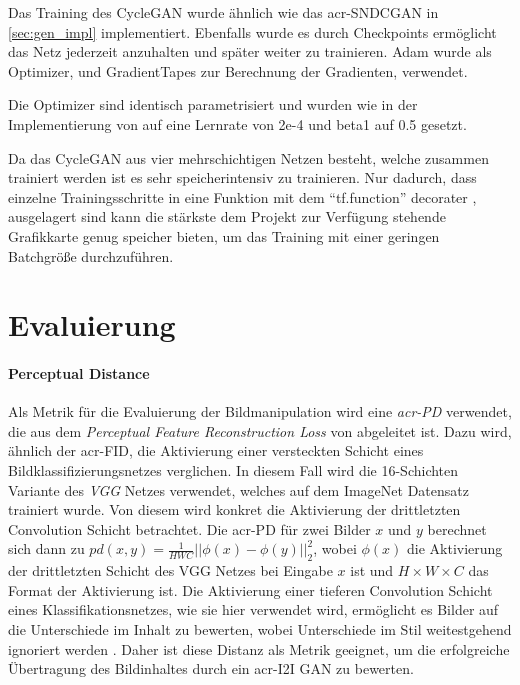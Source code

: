  Das Training des CycleGAN wurde ähnlich wie das \gls{acr-SNDCGAN} in \cref{sec:gen_impl} implementiert. Ebenfalls wurde es durch Checkpoints ermöglicht das Netz jederzeit anzuhalten und später weiter zu trainieren. Adam \cite{tf:adam} wurde als Optimizer, und GradientTapes \cite{tf:gradientape} zur Berechnung der Gradienten, verwendet.
 
Die Optimizer sind identisch parametrisiert und wurden wie in der Implementierung von \cite{brownlee_how_2019-1} auf eine Lernrate von 2e-4 und beta1 auf 0.5 gesetzt. 

Da das CycleGAN aus vier mehrschichtigen Netzen besteht, welche zusammen trainiert werden ist es sehr speicherintensiv zu trainieren. Nur dadurch, dass einzelne Trainingsschritte in eine Funktion mit dem \enquote{tf.function} decorater \cite{noauthor_tffunction_nodate}, ausgelagert sind kann die stärkste dem Projekt zur Verfügung stehende Grafikkarte genug speicher bieten, um das Training mit einer geringen Batchgröße durchzuführen. 


 \section{Evaluierung} %

 \paragraph{Perceptual Distance} Als Metrik für die Evaluierung der
 Bildmanipulation wird eine \emph{\gls{acr-PD}} \cite{pang2021image} verwendet, die aus dem
 \emph{Perceptual Feature Reconstruction Loss} von
 \citeauthor{johnson2016perceptual} \cite{johnson2016perceptual} abgeleitet ist. Dazu wird, ähnlich der
 \gls{acr-FID}, die Aktivierung einer versteckten Schicht eines
 Bildklassifizierungsnetzes verglichen. In diesem Fall wird die 16-Schichten
 Variante des \emph{VGG} Netzes \cite{simonyan2014very} verwendet, welches auf
 dem ImageNet \cite{russakovsky2015imagenet} Datensatz trainiert wurde. Von diesem
 wird konkret die Aktivierung der drittletzten Convolution Schicht betrachtet.
 Die \gls{acr-PD} für zwei Bilder $x$ und $y$ berechnet sich dann zu $pd(x,y) = \frac{1}{HWC}
 ||\phi(x) - \phi(y)||_2^{2}$, wobei $\phi(x)$ die Aktivierung der drittletzten
 Schicht des VGG Netzes bei Eingabe $x$ ist und $H \times W \times C$ das Format
 der Aktivierung ist. Die Aktivierung einer tieferen
 Convolution Schicht eines Klassifikationsnetzes, wie sie hier verwendet wird,
 ermöglicht es Bilder auf die Unterschiede im Inhalt zu bewerten, wobei
 Unterschiede im Stil weitestgehend ignoriert werden
 \cite{johnson2016perceptual,pang2021image}. Daher ist diese Distanz als
 Metrik geeignet, um die erfolgreiche Übertragung des Bildinhaltes durch ein
 \gls{acr-I2I} GAN zu bewerten.